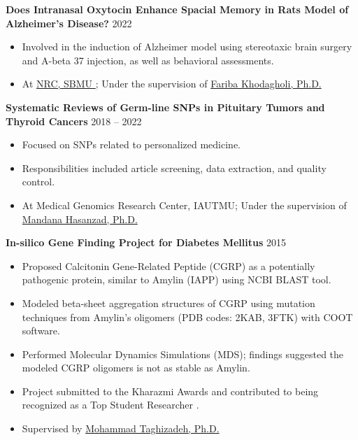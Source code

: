 \documentclass[letterpaper,11pt]{article} %
\begin{document}
\textbf{Does Intranasal Oxytocin Enhance Spacial Memory in Rats Model of Alzheimer's Disease?} \hfill \footnotesize{2022} \normalsize
\vspace{-0.5\baselineskip}
\begin{itemize}
\item Involved in the induction of Alzheimer model using stereotaxic brain surgery and A-beta 37 injection, as well as behavioral assessments.
\item At \hyperlink{NRC}{NRC, SBMU \faArrowAltCircleUp[regular]}; Under the supervision of \href{https://scholar.google.com/citations?user=MtZcJ1EAAAAJ\&hl=en\&oi=ao}{Fariba Khodagholi, Ph.D.}
\end{itemize}

\textbf{Systematic Reviews of Germ-line SNPs in Pituitary Tumors and Thyroid Cancers} \hfill \footnotesize{2018 -- 2022} \normalsize
\vspace{-0.5\baselineskip}
\begin{itemize}
\item Focused on SNPs related to personalized medicine.
\item Responsibilities included article screening, data extraction, and quality control.
\item At Medical Genomics Research Center, IAUTMU; Under the supervision of \hyperlink{Mandana}{Mandana Hasanzad, Ph.D. \faArrowAltCircleDown[regular]}
\end{itemize}

\textbf{In-silico Gene Finding Project for Diabetes Mellitus} \hfill \footnotesize{2015} \normalsize
\vspace{-0.5\baselineskip}
\begin{itemize}
\item Proposed Calcitonin Gene-Related Peptide (CGRP) as a potentially pathogenic protein, similar to Amylin (IAPP) using NCBI BLAST tool.
\item Modeled beta-sheet aggregation structures of CGRP using mutation techniques from Amylin's oligomers (PDB codes: 2KAB, 3FTK) with COOT software.
\item Performed Molecular Dynamics Simulations (MDS); findings suggested the modeled CGRP oligomers is not as stable as Amylin.
\item Project submitted to the Kharazmi Awards and contributed to being recognized as a Top Student Researcher \hyperlink{Kharazmi}{\faArrowAltCircleDown[regular]}.
\item Supervised by \href{https://scholar.google.com/citations?hl=en\&user=rAkrs70AAAAJ}{Mohammad Taghizadeh, Ph.D.}
\end{itemize}
\end{document}
